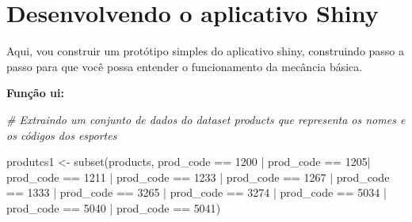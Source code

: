 \documentclass[
]{book}
\newenvironment{Shaded}{\begin{snugshade}}{\end{snugshade}}
\newcommand{\CommentTok}[1]{\textcolor[rgb]{0.56,0.35,0.01}{\textit{#1}}}
\newcommand{\DecValTok}[1]{\textcolor[rgb]{0.00,0.00,0.81}{#1}}
\newcommand{\FunctionTok}[1]{\textcolor[rgb]{0.00,0.00,0.00}{#1}}
\newcommand{\NormalTok}[1]{#1}
\newcommand{\OtherTok}[1]{\textcolor[rgb]{0.56,0.35,0.01}{#1}}
\newcommand{\SpecialCharTok}[1]{\textcolor[rgb]{0.00,0.00,0.00}{#1}}
\begin{document}
\hypertarget{desenvolvendo-o-aplicativo-shiny}{%
\section{\texorpdfstring{\textbf{Desenvolvendo o aplicativo Shiny}}{Desenvolvendo o aplicativo Shiny}}\label{desenvolvendo-o-aplicativo-shiny}}

Aqui, vou construir um protótipo simples do aplicativo shiny, construindo passo a passo para que você possa entender o funcionamento da mecância básica.

\textbf{Função ui:}

\begin{Shaded}
\begin{Highlighting}[]
\CommentTok{\# Extraindo um conjunto de dados do dataset products que representa os nomes e os códigos dos esportes}

\NormalTok{produtcs1 }\OtherTok{\textless{}{-}} \FunctionTok{subset}\NormalTok{(products, prod\_code }\SpecialCharTok{==} \DecValTok{1200} \SpecialCharTok{|}\NormalTok{ prod\_code }\SpecialCharTok{==} \DecValTok{1205}\SpecialCharTok{|}\NormalTok{ prod\_code }\SpecialCharTok{==} \DecValTok{1211} 
                    \SpecialCharTok{|}\NormalTok{ prod\_code }\SpecialCharTok{==} \DecValTok{1233} \SpecialCharTok{|}\NormalTok{ prod\_code }\SpecialCharTok{==} \DecValTok{1267} \SpecialCharTok{|}\NormalTok{ prod\_code }\SpecialCharTok{==} \DecValTok{1333} \SpecialCharTok{|}\NormalTok{ prod\_code }\SpecialCharTok{==} \DecValTok{3265} 
                    \SpecialCharTok{|}\NormalTok{ prod\_code }\SpecialCharTok{==} \DecValTok{3274} \SpecialCharTok{|}\NormalTok{ prod\_code }\SpecialCharTok{==} \DecValTok{5034} \SpecialCharTok{|}\NormalTok{ prod\_code }\SpecialCharTok{==} \DecValTok{5040} \SpecialCharTok{|}\NormalTok{ prod\_code }\SpecialCharTok{==} \DecValTok{5041}\NormalTok{)}


\end{Highlighting}
\end{Shaded}
\end{document}
